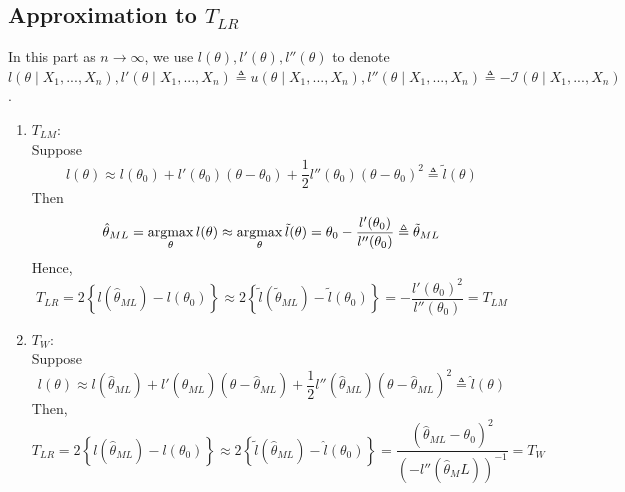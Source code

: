 \documentclass[11pt]{elegantbook}
\newcommand{\argmax}{\operatornamewithlimits{argmax}}
\begin{document}
\subsection{Approximation to $T_{LR}$}
In this part as $n \rightarrow \infty$, we use $l(\theta), l'(\theta), l''(\theta)$ to denote $l(\theta\mid X_1,...,X_n), l'(\theta\mid X_1,...,X_n)\triangleq u(\theta\mid X_1,...,X_n), l''(\theta\mid X_1,...,X_n)\triangleq - \mathcal{I}(\theta\mid X_1,...,X_n)$.
\begin{enumerate}[(1).]
    \item $T_{LM}$:\\
    Suppose $$l(\theta)\approx l(\theta_0)+l'(\theta_0)(\theta-\theta_0)+\frac{1}{2}l''(\theta_0)(\theta-\theta_0)^2\triangleq\tilde{l}(\theta)$$
    Then $$\hat{\theta}_{ML}=\argmax_{\theta}l (\theta)\approx \argmax_{\theta}\tilde{l}(\theta)=\theta_0-\frac{l'(\theta_0)}{l''(\theta_0)}\triangleq\tilde{\theta}_{ML}$$
    Hence, $$T_{LR}=2\left\{l(\hat{\theta}_{ML})-l(\theta_0)\right\}\approx 2\left\{\tilde{l}(\tilde{\theta}_{ML})-\tilde{l}(\theta_0)\right\}=-\frac{l'(\theta_0)^2}{l''(\theta_0)}=T_{LM}$$
    \item $T_W$:\\
    Suppose $$l(\theta)\approx l(\hat{\theta}_{ML})+l'(\hat{\theta}_{ML})(\theta-\hat{\theta}_{ML})+\frac{1}{2}l''(\hat{\theta}_{ML})(\theta-\hat{\theta}_{ML})^2\triangleq\hat{l}(\theta)$$
    Then,
    $$T_{LR}=2\left\{l(\hat{\theta}_{ML})-l(\theta_0)\right\}\approx 2\left\{\tilde{l}(\hat{\theta}_{ML})-\hat{l}(\theta_0)\right\}=\frac{(\hat{\theta}_{ML}-\theta_0)^2}{(-l''(\hat{\theta}_ML))^{-1}}=T_W$$
\end{enumerate}
\end{document}
